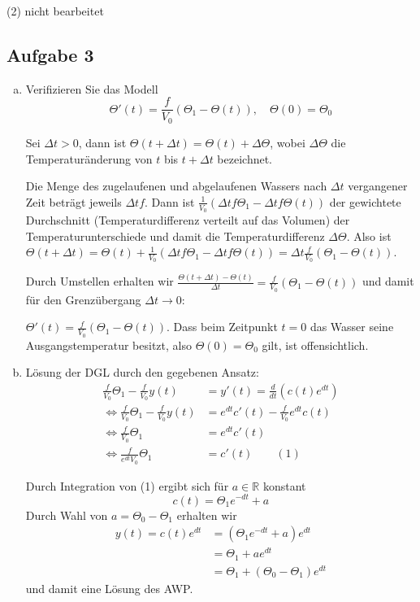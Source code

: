 \documentclass[11pt,a4paper,ngerman]{article}
\begin{document}
(2) nicht bearbeitet

\subsection*{Aufgabe 3}
\begin{enumerate}[a)]
\item Verifizieren Sie das  Modell
$$ \Theta'(t) = \frac{f}{V_0}(\Theta_1 - \Theta(t)), \quad \Theta(0) = \Theta_0$$ 

Sei $\Delta t > 0$, dann ist $\Theta(t + \Delta t) = \Theta(t) + \Delta \Theta$, wobei $\Delta \Theta$ die Temperaturänderung von $t$ bis $t + \Delta t$ bezeichnet.

Die Menge des zugelaufenen und abgelaufenen Wassers nach $\Delta t$ vergangener Zeit beträgt jeweils $\Delta t f$. Dann ist $\frac{1}{V_0}(\Delta t f \Theta_1 - \Delta t f \Theta(t))$ der gewichtete Durchschnitt (Temperaturdifferenz verteilt auf das Volumen) der Temperaturunterschiede und damit die Temperaturdifferenz $\Delta \Theta$. Also ist $\Theta(t + \Delta t) = \Theta(t) + \frac{1}{V_0}(\Delta t f \Theta_1 - \Delta t f \Theta(t)) = \Delta t \frac{f}{V_0} (\Theta_1 - \Theta(t))$.

Durch Umstellen erhalten wir $\frac{\Theta(t + \Delta t) - \Theta(t)}{\Delta t} = \frac{f}{V_0} (\Theta_1 - \Theta(t))$ und damit für den Grenzübergang $\Delta t \to 0$:

$\Theta'(t) = \frac{f}{V_0} (\Theta_1 - \Theta(t))$. Dass beim Zeitpunkt $t= 0$ das Wasser seine Ausgangstemperatur besitzt, also $\Theta(0) = \Theta_0$ gilt, ist offensichtlich.

\item Lösung der  DGL durch den gegebenen Ansatz: 
\begin{equation*}\begin{split}
\frac{f}{V_0} \Theta_1 -\frac{f}{V_0} y(t) &= y' (t) = \frac{d}{dt} \left(c(t) e^{dt} \right) \\
\Leftrightarrow \frac{f}{V_0} \Theta_1 -\frac{f}{V_0} y(t) &= e^{dt} c'(t) - \frac{f}{V_0} e^{dt} c(t) \\
\Leftrightarrow \frac{f}{V_0} \Theta_1 &= e^{dt} c'(t) \\ 
\Leftrightarrow  \frac{f}{e^{dt} V_0} \Theta_1 &= c'(t) \qquad (1)
\end{split}\end{equation*}

Durch Integration von (1) ergibt sich für $a \in \mathbb{R}$ konstant
\begin{equation*}
c(t) = \Theta_1 e^{-dt} + a
\end{equation*}
Durch Wahl von $a = \Theta_0 - \Theta_1$ erhalten wir 
\begin{equation*}\begin{split}
y(t) = c(t) e^{dt} &= \left(\Theta_1 e^{-dt} + a\right) e^{dt} \\
&= \Theta_1 + a e^{dt} \\
&=  \Theta_1 + (\Theta_0 - \Theta_1) e^{dt}
\end{split}\end{equation*}
und damit eine Lösung des AWP.


\end{enumerate}
\end{document}

